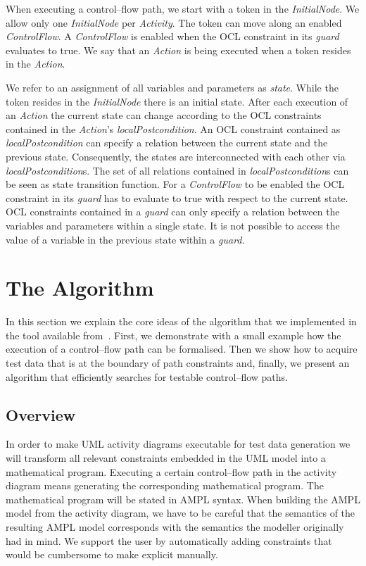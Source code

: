 \documentclass[runningheads,a4paper]{llncs}%
\newcommand{\UMLType}[1]{\textsf{\textit{#1}}} %
\newcommand{\UMLReference}[1]{\textsf{\textit{#1}}} %
\begin{document}
When executing a control--flow path, we start with a token in the
\UMLType{InitialNode}. We allow only one \UMLType{InitialNode} per
\UMLType{Activity}. The token can move along an enabled \UMLType{ControlFlow}. A
\UMLType{ControlFlow} is enabled when the OCL constraint in its
\UMLReference{guard} evaluates to true. We say that an \UMLType{Action} is being
executed when a token resides in the \UMLType{Action}.

We refer to an assignment of all variables and parameters as \emph{state}. While
the token resides in the \UMLType{InitialNode} there is an initial state. After
each execution of an \UMLType{Action} the current state can change according to
the OCL constraints contained in the \UMLType{Action}'s
\UMLReference{localPostcondition}. An OCL constraint contained as
\UMLType{localPostcondition} can specify a relation between the current state
and the previous state. Consequently, the states are interconnected with each
other via \UMLReference{localPostcondition}s. The set of all relations contained
in \UMLType{localPostcondition}s can be seen as state transition function. For a
\UMLType{ControlFlow} to be enabled the OCL constraint in its
\UMLReference{guard} has to evaluate to true with respect to the current state.
OCL constraints contained in a \UMLReference{guard} can only specify a relation
between the variables and parameters within a single state. It is not possible
to access the value of a variable in the previous state within a
\UMLReference{guard}.
\section{The Algorithm}%
\label{sec:Algorithm}%
In this section we explain the core ideas of the algorithm that we implemented
in the tool available from~\cite{PartegWebsite}. First, we demonstrate with a
small example how the execution of a control--flow path can be formalised. Then
we show how to acquire test data that is at the boundary of path constraints
and, finally, we present an algorithm that efficiently searches for testable
control--flow paths.%
\subsection{Overview}%
In order to make UML activity diagrams executable for test data generation we
will transform all relevant constraints embedded in the UML model into a
mathematical program. Executing a certain control--flow path in the activity
diagram means generating the corresponding mathematical program. The
mathematical program will be stated in AMPL syntax. 
When building the AMPL model from the activity diagram, we have to be careful
that the semantics of the resulting AMPL model corresponds with the semantics
the modeller originally had in mind. We support the user by automatically adding
constraints that would be cumbersome to make explicit manually.
\end{document}
